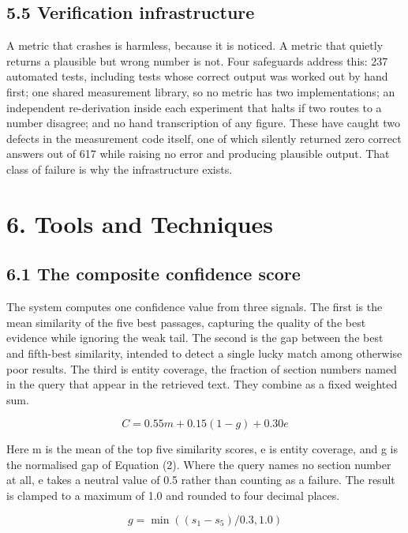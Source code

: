 \documentclass[12pt,a4paper]{article}
\begin{document}
\subsection*{5.5 Verification infrastructure}
A metric that crashes is harmless, because it is noticed. A metric that quietly returns a plausible but wrong number is not. Four safeguards address this: 237 automated tests, including tests whose correct output was worked out by hand first; one shared measurement library, so no metric has two implementations; an independent re-derivation inside each experiment that halts if two routes to a number disagree; and no hand transcription of any figure. These have caught two defects in the measurement code itself, one of which silently returned zero correct answers out of 617 while raising no error and producing plausible output. That class of failure is why the infrastructure exists.

\section*{6. Tools and Techniques}
\subsection*{6.1 The composite confidence score}
The system computes one confidence value from three signals. The first is the mean similarity of the five best passages, capturing the quality of the best evidence while ignoring the weak tail. The second is the gap between the best and fifth-best similarity, intended to detect a single lucky match among otherwise poor results. The third is entity coverage, the fraction of section numbers named in the query that appear in the retrieved text. They combine as a fixed weighted sum.


\begin{equation}
C  =  0.55 m  +  0.15 (1 - g)  +  0.30 e
\end{equation}


Here m is the mean of the top five similarity scores, e is entity coverage, and g is the normalised gap of Equation (2). Where the query names no section number at all, e takes a neutral value of 0.5 rather than counting as a failure. The result is clamped to a maximum of 1.0 and rounded to four decimal places.


\begin{equation}
g  =  \min( ( s_{1} - s_{5} ) / 0.3 ,  1.0 )
\end{equation}
\end{document}
